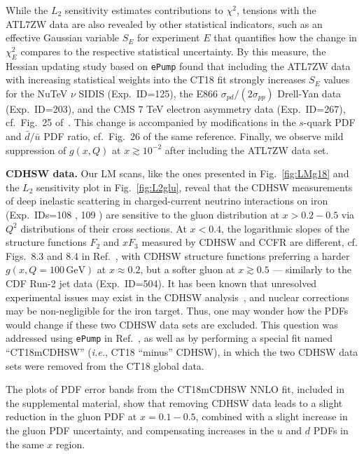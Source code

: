While the $L_2$ sensitivity estimates contributions
to $\chi^2$, tensions with the ATL7ZW data are also revealed by other
statistical indicators, such as an effective Gaussian variable $S_E$
for experiment $E$ that quantifies how the change in $\chi^2_E$
compares to the respective statistical uncertainty. By this measure, 
the Hessian updating study \cite{Hou:2019gfw} based on \texttt{ePump} 
found that including the ATL7ZW data with
increasing statistical weights into the CT18 fit strongly increases
$S_E$ values for the NuTeV $\nu$ SIDIS (Exp.~ID=125),
the E866 $\sigma_{pd}/(2\sigma_{pp})$ Drell-Yan data (Exp.~ID=203),
and the CMS 7 TeV electron asymmetry data (Exp.~ID=267),
cf.~Fig.~25 of~\cite{Hou:2019gfw}. This change is accompanied by
modifications in the $s$-quark PDF and $\bar{d}/\bar{u}$ PDF ratio,
cf.~Fig.~26 of the same reference. Finally, we observe mild
suppression of $g(x,Q)$ at $x \gtrsim 10^{-2}$ after including the
ATL7ZW data set.

{\bf CDHSW data.}
Our LM scans, like the ones presented in Fig.~\ref{fig:LMg18} and the
$L_2$ sensitivity plot in Fig.~\ref{fig:L2glu}, reveal
that the CDHSW measurements of deep inelastic scattering
in charged-current neutrino interactions on iron
(Exp.~IDs=108 \cite{Berge:1989hr}, 109 \cite{Berge:1989hr})
are sensitive to the gluon distribution at $x > 0.2-0.5$ via $Q^2$
distributions of their cross sections. At $x <0.4$, the logarithmic
slopes of the structure functions $F_2$ and $xF_3$ measured by CDHSW
and CCFR are different, cf. Figs.~8.3 and 8.4 in
Ref.~\cite{Seligman:1997fe}, with CDHSW structure functions preferring
a harder $g(x,Q\!=\!100\,\mathrm{GeV})$ at $x\!\approx\!0.2$, but a softer
gluon at $x\!\gtrsim\!0.5$ --- similarly to the CDF Run-2 jet data
(Exp.~ID=504). It has been known that unresolved experimental issues may exist
in the CDHSW analysis~\cite{Barone:1999yv}, and nuclear corrections
may be non-negligible for the iron target. Thus,
one may wonder how the PDFs would change if
these two CDHSW data sets are excluded. This question was addressed
using  \texttt{ePump} in Ref.~\cite{Hou:2019gfw}, as well as by performing a special fit named
``CT18mCDHSW'' ({\it i.e.}, CT18 ``minus'' CDHSW), in which
the two CDHSW data sets were removed from the CT18 global data.

The plots of PDF error bands from the CT18mCDHSW NNLO fit, included in
the supplemental material, show that removing CDHSW data leads to a
slight reduction in the gluon PDF at $x=0.1-0.5$, combined with a
slight increase in the gluon PDF uncertainty, and compensating
increases in the $u$ and $d$ PDFs in the same $x$ region. 

